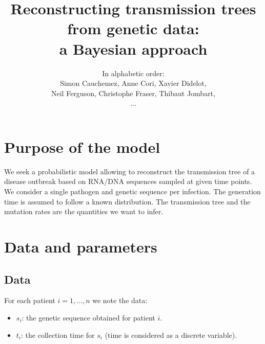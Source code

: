 \documentclass[10pt]{article}
\author{In alphabetic order: \\Simon Cauchemez, Anne Cori, Xavier Didelot, \\Neil Ferguson, Christophe Fraser, Thibaut Jombart,\\...}
\title{Reconstructing transmission trees from genetic data: \\a Bayesian approach}
\begin{document}
\maketitle

\section*{Purpose of the model}
We seek a probabilistic model allowing to reconstruct the transmission tree of a disease outbreak based on RNA/DNA sequences sampled at given time points.
We consider a single pathogen and genetic sequence per infection.
The generation time is assumed to follow a known distribution.
The transmission tree and the mutation rates are the quantities we want to infer.



\section*{Data and parameters}

\subsection*{Data}
For each patient $i=1,\ldots,n$ we note the data:
\begin{itemize}
	\item $s_i$: the genetic sequence obtained for patient $i$.
	\item $t_i$: the collection time for $s_i$ (time is considered as a discrete variable).
\end{itemize}
\end{document}
